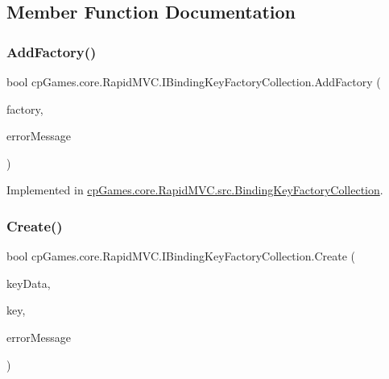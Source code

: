 \subsection{Member Function Documentation}
\mbox{\label{interfacecp_games_1_1core_1_1_rapid_m_v_c_1_1_i_binding_key_factory_collection_aa7aace3ebec361b82a563258ddda2213}} 
\subsubsection{\texorpdfstring{AddFactory()}{AddFactory()}}
{\footnotesize\ttfamily bool cp\+Games.\+core.\+Rapid\+M\+V\+C.\+I\+Binding\+Key\+Factory\+Collection.\+Add\+Factory (\begin{DoxyParamCaption}\item[{\mbox{\hyperlink{interfacecp_games_1_1core_1_1_rapid_m_v_c_1_1_i_binding_key_factory}{I\+Binding\+Key\+Factory}}}]{factory,  }\item[{out string}]{error\+Message }\end{DoxyParamCaption})}



Implemented in \mbox{\hyperlink{classcp_games_1_1core_1_1_rapid_m_v_c_1_1src_1_1_binding_key_factory_collection_a27315eae9bada77b6da3eac11afb3f02}{cp\+Games.\+core.\+Rapid\+M\+V\+C.\+src.\+Binding\+Key\+Factory\+Collection}}.

\mbox{\label{interfacecp_games_1_1core_1_1_rapid_m_v_c_1_1_i_binding_key_factory_collection_a0e768b4fdf7855f5b5f9b7ac0c1865c8}} 
\subsubsection{\texorpdfstring{Create()}{Create()}}
{\footnotesize\ttfamily bool cp\+Games.\+core.\+Rapid\+M\+V\+C.\+I\+Binding\+Key\+Factory\+Collection.\+Create (\begin{DoxyParamCaption}\item[{object}]{key\+Data,  }\item[{out \mbox{\hyperlink{interfacecp_games_1_1core_1_1_rapid_m_v_c_1_1_i_binding_key}{I\+Binding\+Key}}}]{key,  }\item[{out string}]{error\+Message }\end{DoxyParamCaption})}



